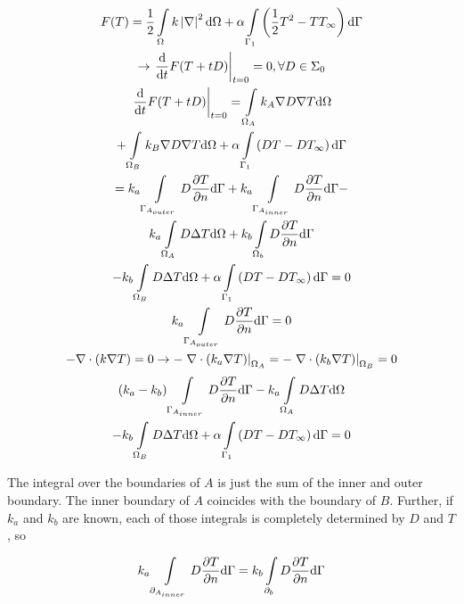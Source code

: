 \begin{gather*}
F(T) = \frac{1}{2}\int\displaylimits_{\Omega}k\left|\nabla\right|^2\mathrm{d}\Omega + \alpha \int\displaylimits_{\Gamma_1}\left(\frac{1}{2}T^2-TT_{\infty}\right)\mathrm{d}\Gamma\\
\rightarrow \left.\frac{\mathrm{d}}{\mathrm{d}t}F(T+tD)\right|_{t=0} = 0, \forall D \in \Sigma_0\\
\left.\frac{\mathrm{d}}{\mathrm{d}t}F(T+tD)\right|_{t=0} =  \int\displaylimits_{\Omega_A}k_A\nabla D \nabla T \mathrm{d}\Omega\\ + \int\displaylimits_{\Omega_B}k_B\nabla D \nabla T \mathrm{d}\Omega + \alpha \int\displaylimits_{\Gamma_1}\left(DT-DT_{\infty}\right)\mathrm{d}\Gamma\\
= k_a\int\displaylimits_{\Gamma_{A_{outer}}}D\frac{\partial T}{\partial n}\mathrm{d}\Gamma + k_a\int\displaylimits_{\Gamma_{A_{inner}}}D\frac{\partial T}{\partial n}\mathrm{d}\Gamma - \\
k_a\int\displaylimits_{\Omega_A}D\Delta T \mathrm{d}\Omega + k_b \int\displaylimits_{\Omega_b}D\frac{\partial T}{\partial n}\mathrm{d}\Gamma \\- k_b\int\displaylimits_{\Omega_B}D\Delta T \mathrm{d}\Omega + \alpha \int\displaylimits_{\Gamma_1}\left(DT-DT_{\infty}\right)\mathrm{d}\Gamma = 0\\
k_a\int\displaylimits_{\Gamma_{A_{outer}}}D\frac{\partial T}{\partial n}\mathrm{d}\Gamma = 0\\
-\nabla \cdot (k\nabla T) = 0 \rightarrow -\left.\nabla \cdot (k_a\nabla T)\right|_{\Omega_A} = -\left.\nabla \cdot (k_b\nabla T)\right|_{\Omega_B} = 0
\end{gather*}
\begin{gather*}
\left(k_a-k_b\right)\int\displaylimits_{\Gamma_{A_{inner}}}D\frac{\partial T}{\partial n}\mathrm{d}\Gamma - k_a\int\displaylimits_{\Omega_A}D\Delta T \mathrm{d}\Omega\\ - k_b\int\displaylimits_{\Omega_B}D\Delta T \mathrm{d}\Omega + \alpha \int\displaylimits_{\Gamma_1}\left(DT-DT_{\infty}\right)\mathrm{d}\Gamma = 0\\
\end{gather*}

The integral over the boundaries of $A$ is just the sum of the inner and outer boundary. The inner boundary of $A$ coincides with the boundary of $B$. Further, if $k_a$ and $k_b$ are known, each of those integrals is completely determined by $D$ and $T$, so 

\begin{gather*}
k_a\int\displaylimits_{\partial_{A_{inner}}}D\frac{\partial T}{\partial n} \mathrm{d}\Gamma = k_b\int\displaylimits_{\partial_{b}}D\frac{\partial T}{\partial n} \mathrm{d}\Gamma
\end{gather*}

